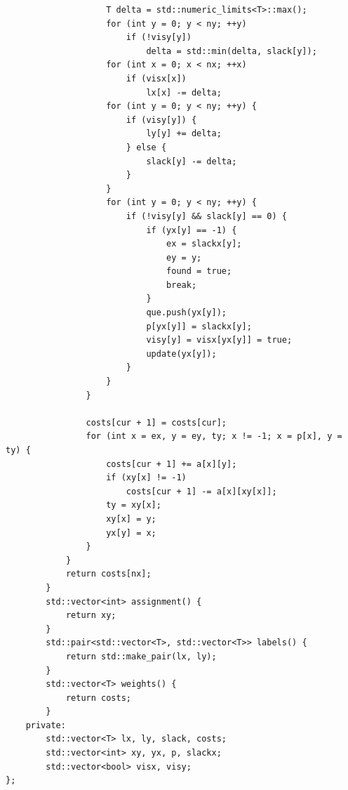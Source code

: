 \documentclass[twoside]{article}
\begin{document}
\begin{lstlisting}
                    T delta = std::numeric_limits<T>::max();
                    for (int y = 0; y < ny; ++y)
                        if (!visy[y])
                            delta = std::min(delta, slack[y]);
                    for (int x = 0; x < nx; ++x)
                        if (visx[x])
                            lx[x] -= delta;
                    for (int y = 0; y < ny; ++y) {
                        if (visy[y]) {
                            ly[y] += delta;
                        } else {
                            slack[y] -= delta;
                        }
                    }
                    for (int y = 0; y < ny; ++y) {
                        if (!visy[y] && slack[y] == 0) {
                            if (yx[y] == -1) {
                                ex = slackx[y];
                                ey = y;
                                found = true;
                                break;
                            }
                            que.push(yx[y]);
                            p[yx[y]] = slackx[y];
                            visy[y] = visx[yx[y]] = true;
                            update(yx[y]);
                        }
                    }
                }
                 
                costs[cur + 1] = costs[cur];
                for (int x = ex, y = ey, ty; x != -1; x = p[x], y = ty) {
                    costs[cur + 1] += a[x][y];
                    if (xy[x] != -1)
                        costs[cur + 1] -= a[x][xy[x]];
                    ty = xy[x];
                    xy[x] = y;
                    yx[y] = x;
                }
            }
            return costs[nx];
        }
        std::vector<int> assignment() {
            return xy;
        }
        std::pair<std::vector<T>, std::vector<T>> labels() {
            return std::make_pair(lx, ly);
        }
        std::vector<T> weights() {
            return costs;
        }
    private:
        std::vector<T> lx, ly, slack, costs;
        std::vector<int> xy, yx, p, slackx;
        std::vector<bool> visx, visy;
};\end{lstlisting}
\end{document}
